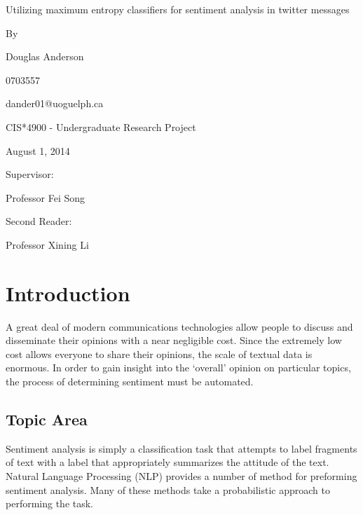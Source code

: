 \documentclass[12pt]{article}
\begin{document}
\thispagestyle{empty}
\begin{center}

\huge

Utilizing maximum entropy classifiers for sentiment analysis in twitter messages

\large
\vspace{2.0cm}
By

\vspace{1.0cm}
Douglas Anderson

0703557

dander01@uoguelph.ca

\vspace{1.5cm}
CIS*4900 - Undergraduate Research Project

August 1, 2014 %

\vspace{1.5cm}

Supervisor:

Professor Fei Song

\vspace{1.5cm}

Second Reader:

Professor Xining Li

\end{center}


\newpage
\pagestyle{headings}
\setcounter{page}{1}

\section{Introduction}

A great deal of modern communications technologies allow people to discuss and
disseminate their opinions with a near negligible cost. Since the extremely low
cost allows everyone to share their opinions, the scale of textual data is
enormous. In order to gain insight into the `overall' opinion on particular
topics, the process of determining sentiment must be automated.

\subsection{Topic Area}

Sentiment analysis is simply a classification task that attempts to label
fragments of text with a label that appropriately summarizes the attitude of
the text. Natural Language Processing (NLP) provides a number of method for
preforming sentiment analysis. Many of these methods take a probabilistic
approach to performing the task.
\end{document}
